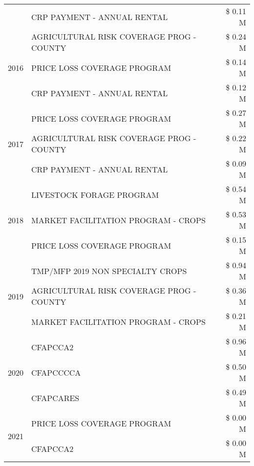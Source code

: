 \begin{tabular}{llr}
 & CRP PAYMENT - ANNUAL RENTAL & \$ 0.11 M \\
\cline{1-3}
\multirow[t]{3}{*}{2016} & AGRICULTURAL RISK COVERAGE PROG - COUNTY & \$ 0.24 M \\
 & PRICE LOSS COVERAGE PROGRAM & \$ 0.14 M \\
 & CRP PAYMENT - ANNUAL RENTAL & \$ 0.12 M \\
\cline{1-3}
\multirow[t]{3}{*}{2017} & PRICE LOSS COVERAGE PROGRAM & \$ 0.27 M \\
 & AGRICULTURAL RISK COVERAGE PROG - COUNTY & \$ 0.22 M \\
 & CRP PAYMENT - ANNUAL RENTAL & \$ 0.09 M \\
\cline{1-3}
\multirow[t]{3}{*}{2018} & LIVESTOCK FORAGE PROGRAM & \$ 0.54 M \\
 & MARKET FACILITATION PROGRAM - CROPS & \$ 0.53 M \\
 & PRICE LOSS COVERAGE PROGRAM & \$ 0.15 M \\
\cline{1-3}
\multirow[t]{3}{*}{2019} & TMP/MFP 2019 NON SPECIALTY CROPS & \$ 0.94 M \\
 & AGRICULTURAL RISK COVERAGE PROG - COUNTY & \$ 0.36 M \\
 & MARKET FACILITATION PROGRAM - CROPS & \$ 0.21 M \\
\cline{1-3}
\multirow[t]{3}{*}{2020} & CFAPCCA2 & \$ 0.96 M \\
 & CFAPCCCCA & \$ 0.50 M \\
 & CFAPCARES & \$ 0.49 M \\
\cline{1-3}
\multirow[t]{2}{*}{2021} & PRICE LOSS COVERAGE PROGRAM & \$ 0.00 M \\
 & CFAPCCA2 & \$ 0.00 M \\
\cline{1-3}
\bottomrule
\end{tabular}
